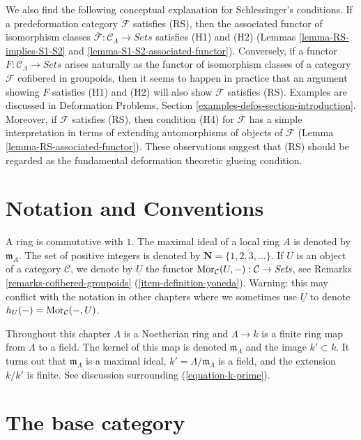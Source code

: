 \medskip\noindent
We also find the following conceptual explanation for Schlessinger's
conditions. If a predeformation category $\mathcal{F}$ satisfies (RS),
then the associated functor of isomorphism classes
$\overline{\mathcal{F}}: \mathcal{C}_\Lambda \to \textit{Sets}$
satisfies (H1) and (H2)
(Lemmas \ref{lemma-RS-implies-S1-S2} and
\ref{lemma-S1-S2-associated-functor}).
Conversely, if a functor
$F : \mathcal{C}_\Lambda \to \textit{Sets}$
arises naturally as the functor of isomorphism classes of
a category $\mathcal{F}$ cofibered in groupoids, then it seems to happen in
practice that an argument showing $F$ satisfies (H1) and (H2) will also show
$\mathcal{F}$ satisfies (RS). Examples are discussed in
Deformation Problems, Section
\ref{examples-defos-section-introduction}.
Moreover, if $\mathcal{F}$ satisfies (RS), then condition
(H4) for $\overline{\mathcal{F}}$ has a simple interpretation in terms of
extending automorphisms of objects of $\mathcal{F}$
(Lemma \ref{lemma-RS-associated-functor}).
These observations suggest that (RS) should be regarded as the
fundamental deformation theoretic glueing condition.




\section{Notation and Conventions}
\label{section-notations-conventions}

\noindent
A ring is commutative with $1$. The  maximal ideal of a local ring $A$
is denoted by $\mathfrak{m}_A$. The set of positive integers is denoted
by $\mathbf{N} = \{1, 2, 3, \ldots\}$. If $U$ is an object of a
category $\mathcal{C}$, we denote by $\underline{U}$
the functor
$\mathop{\mathrm{Mor}}\nolimits_\mathcal{C}(U, -): \mathcal{C} \to \textit{Sets}$, see
Remarks \ref{remarks-cofibered-groupoids} (\ref{item-definition-yoneda}).
Warning: this may conflict with the notation in other chapters where we
sometimes use $\underline{U}$ to denote $h_U(-) = \mathop{\mathrm{Mor}}\nolimits_\mathcal{C}(-, U)$.

\medskip\noindent
Throughout this chapter $\Lambda$ is a Noetherian ring and
$\Lambda \to k$ is a finite ring map from $\Lambda$ to a field.
The kernel of this map is denoted $\mathfrak m_\Lambda$ and the
image $k' \subset k$. It turns out that $\mathfrak m_\Lambda$ is
a maximal ideal, $k' = \Lambda/\mathfrak m_\Lambda$ is a field, and
the extension $k/k'$ is finite. See discussion surrounding
(\ref{equation-k-prime}).


\section{The base category}
\label{section-CLambda}


